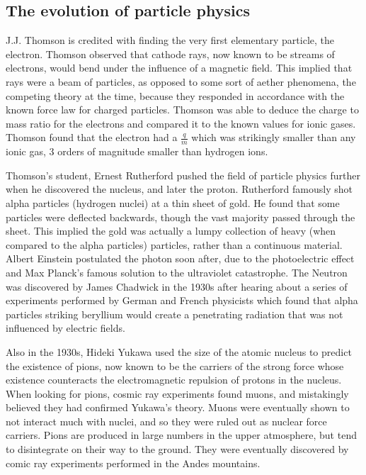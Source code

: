   \subsection{The evolution of particle physics} \label{sec:history}
   J.J. Thomson is credited with finding the very first elementary particle, \cite{thomson_electron} the electron. Thomson observed that cathode rays, now known to be streams of electrons, would bend under the influence of a magnetic field. This implied that rays were a beam of particles, as opposed to some sort of aether phenomena, the competing theory at the time, because they responded in accordance with the known force law for charged particles. Thomson was able to deduce the charge to mass ratio for the electrons and compared it to the known values for ionic gases. Thomson found that the electron had a $\frac{q}{m}$ which was strikingly smaller than any ionic gas, 3 orders of magnitude smaller than hydrogen ions.

   Thomson's student, Ernest Rutherford pushed the field of particle physics further when he discovered the nucleus, and later the proton. Rutherford famously shot alpha particles (hydrogen nuclei) at a thin sheet of gold. He found that some particles were deflected backwards, though the vast majority passed through the sheet. This implied the gold was actually a lumpy collection of heavy (when compared to the alpha particles) particles, rather than a continuous material. Albert Einstein postulated the photon soon after, due to the photoelectric effect and Max Planck's famous solution to the ultraviolet catastrophe. The Neutron was discovered by James Chadwick in the 1930s after hearing about a series of experiments performed by German and French physicists which found that alpha particles striking beryllium would create a penetrating radiation that was not influenced by electric fields. 

   Also in the 1930s, Hideki Yukawa used the size of the atomic nucleus to predict the existence of pions, now known to be the carriers of the strong force whose existence counteracts the electromagnetic repulsion of protons in the nucleus. When looking for pions, cosmic ray experiments found muons, and mistakingly believed they had confirmed Yukawa's theory. Muons were eventually shown to not interact much with nuclei, and so they were ruled out as nuclear force carriers. Pions are produced in large numbers in the upper atmosphere, but tend to disintegrate on their way to the ground. They were eventually discovered by comic ray experiments performed in the Andes mountains.


